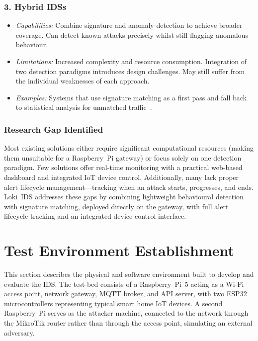 \documentclass[12pt,a4paper]{article}
\begin{document}
\subsubsection*{3. Hybrid IDSs}
\begin{itemize}
    \item \emph{Capabilities:} Combine signature and anomaly detection to achieve broader coverage. Can detect known attacks precisely whilst still flagging anomalous behaviour.
    \item \emph{Limitations:} Increased complexity and resource consumption. Integration of two detection paradigms introduces design challenges. May still suffer from the individual weaknesses of each approach.
    \item \emph{Examples:} Systems that use signature matching as a first pass and fall back to statistical analysis for unmatched traffic~\cite{alaiz2019multiclass}.
\end{itemize}

\subsubsection*{Research Gap Identified}

Most existing solutions either require significant computational resources (making them unsuitable for a Raspberry~Pi gateway) or focus solely on one detection paradigm. Few solutions offer real-time monitoring with a practical web-based dashboard and integrated IoT device control. Additionally, many lack proper alert lifecycle management---tracking when an attack starts, progresses, and ends. Loki~IDS addresses these gaps by combining lightweight behavioural detection with signature matching, deployed directly on the gateway, with full alert lifecycle tracking and an integrated device control interface.


\newpage
\section{Test Environment Establishment}
\label{sec:environment}

This section describes the physical and software environment built to develop and evaluate the IDS. The test-bed consists of a Raspberry~Pi~5 acting as a Wi-Fi access point, network gateway, MQTT broker, and API server, with two ESP32 microcontrollers representing typical smart home IoT devices. A second Raspberry~Pi serves as the attacker machine, connected to the network through the MikroTik router rather than through the access point, simulating an external adversary.
\end{document}
